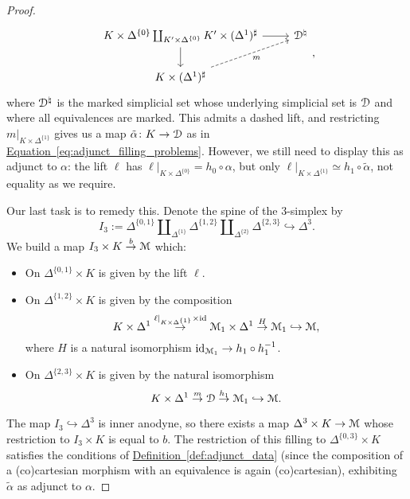 \documentclass[main.tex]{subfiles}
\begin{document}
\begin{proof}
  \begin{equation*}
    \begin{tikzcd}
      K \times \Delta^{\{0\}} \coprod_{K' \times \Delta^{\{0\}}} K' \times (\Delta^{1})^{\sharp}
      \arrow[r]
      \arrow[d]
      & \category{D}^{\natural}
      \\
      K \times (\Delta^{1})^{\sharp}
      \arrow[ur, dashed, swap, "m"]
    \end{tikzcd},
  \end{equation*}
  where $\mathcal{D}^{\natural}$ is the marked simplicial set whose underlying simplicial set is $\mathcal{D}$ and where all equivalences are marked. This admits a dashed lift, and restricting $m|_{K \times \Delta^{\{1\}}}$ gives us a map $\tilde{\alpha}\colon K \to \mathcal{D}$ as in \hyperref[eq:adjunct_filling_problems]{Equation~\ref*{eq:adjunct_filling_problems}}. However, we still need to display this as adjunct to $\alpha$: the lift $\ell$ has $\ell|_{K \times \Delta^{\{0\}}} = h_{0} \circ \alpha$, but only $\ell|_{K \times \Delta^{\{1\}}} \simeq h_{1} \circ \tilde{\alpha}$, not equality as we require.

  Our last task is to remedy this. Denote the spine of the $3$-simplex by
  \begin{equation*}
    I_{3} := \Delta^{\{0, 1\}} \amalg_{\Delta^{\{1\}}} \Delta^{\{1,2\}} \amalg_{\Delta^{\{2\}}} \Delta^{\{2,3\}} \hookrightarrow \Delta^{3}.
  \end{equation*}
  We build a map $I_{3} \times K \overset{b}{\to} \mathcal{M}$ which:
  \begin{itemize}
    \item On $\Delta^{\{0, 1\}} \times K$ is given by the lift $\ell$.

    \item On $\Delta^{\{1, 2\}} \times K$ is given by the composition
      \begin{equation*}
        K \times \Delta^{1} \overset{\ell|_{K \times \Delta^{\{1\}}} \times \mathrm{id}}{\to} \mathcal{M}_{1} \times \Delta^{1} \overset{H}{\to} \mathcal{M}_{1} \hookrightarrow \mathcal{M},
      \end{equation*}
      where $H$ is a natural isomorphism $\mathrm{id}_{\mathcal{M}_{1}} \to h_{1} \circ h_{1}^{-1}$.

    \item On $\Delta^{\{2, 3\}} \times K$ is given by the natural isomorphism
      \begin{equation*}
        K \times \Delta^{1} \overset{m}{\to} \mathcal{D} \overset{h_{1}}{\to} \mathcal{M}_{1} \hookrightarrow \mathcal{M}.
      \end{equation*}
  \end{itemize}
  The map $I_{3} \hookrightarrow \Delta^{3}$ is inner anodyne, so there exists a map $\Delta^{3} \times K \to \mathcal{M}$ whose restriction to $I_{3} \times K$ is equal to $b$. The restriction of this filling to $\Delta^{\{0,3\}} \times K$ satisfies the conditions of \hyperref[def:adjunct_data]{Definition~\ref*{def:adjunct_data}} (since the composition of a (co)cartesian morphism with an equivalence is again (co)cartesian), exhibiting $\tilde{\alpha}$ as adjunct to $\alpha$.
\end{proof}
\end{document}
